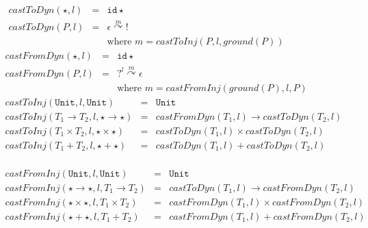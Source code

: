 \documentclass[acmsmall,review,anonymous]{acmart}\settopmatter{printfolios=true,printccs=false,printacmref=false}
\newcommand{\POOunit}[0]{\mathtt{Unit}}
\newcommand{\hyperCoercionI}[0]{\mathtt{id\star}}
\newcommand{\hyperCoercionC}[3]{#1 \overset{#2}{\curvearrowright} #3}
\begin{document}
\begin{figure}
  \[
  \begin{array}{rclr}
    \mathit{castToDyn}(\star,l) &=& \hyperCoercionI{} \\
    \mathit{castToDyn}(P,l) &=&
      \hyperCoercionC{\epsilon}{m}{!} \\
    && \text{where } m = \mathit{castToInj}(P,l,\mathit{ground}(P)) 
  \end{array}
  \]
  \[
  \begin{array}{rclr}
    \mathit{castFromDyn}(\star,l) &=& \hyperCoercionI{} \\
    \mathit{castFromDyn}(P,l) &=& \hyperCoercionC{?^l}{m}{\epsilon} \\
    && \text{where } m = \mathit{castFromInj}(\mathit{ground}(P),l,P) 
  \end{array}
  \]
  \[
  \begin{array}{rclr}
    \mathit{castToInj}(\POOunit,l,\POOunit) &=& \POOunit \\
    \mathit{castToInj}(T_1 \to T_2,l, \star \to \star) &=&
        \mathit{castFromDyn}(T_1,l) \to \mathit{castToDyn}(T_2,l) \\
    \mathit{castToInj}(T_1 \times T_2,l, \star \times \star) &=&
        \mathit{castToDyn}(T_1,l) \times \mathit{castToDyn}(T_2,l) \\
    \mathit{castToInj}(T_1 + T_2,l, \star + \star) &=&
        \mathit{castToDyn}(T_1,l) + \mathit{castToDyn}(T_2,l) \\
  \end{array}
  \]
  
  \[
  \begin{array}{rclr}
    \mathit{castFromInj}(\POOunit,l,\POOunit) &=& \POOunit \\
    \mathit{castFromInj}(\star \to \star,l, T_1 \to T_2) &=&
        \mathit{castToDyn}(T_1,l) \to \mathit{castFromDyn}(T_2,l) \\
    \mathit{castFromInj}(\star \times \star,l, T_1 \times T_2) &=&
        \mathit{castFromDyn}(T_1,l) \times \mathit{castFromDyn}(T_2,l) \\
    \mathit{castFromInj}(\star + \star,l, T_1 + T_2) &=&
        \mathit{castFromDyn}(T_1,l) + \mathit{castFromDyn}(T_2,l) \\
  \end{array}
  \]


\end{figure}
\end{document}

